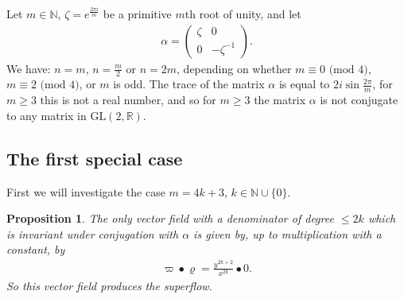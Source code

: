 \documentclass[reqno,12pt]{amsart}
\newtheorem{prop}{Proposition}
\begin{document}
Let $m\in\mathbb{N}$, $\zeta=e^{\frac{2\pi i}{m}}$ be a primitive $m$th root of unity, and let
\begin{eqnarray}
\alpha=\begin{pmatrix}
\zeta & 0\\
0 & -\zeta^{-1}
\end{pmatrix}.\label{alfa}
\end{eqnarray}
We have: $n=m$, $n=\frac{m}{2}$ or $n=2m$, depending on whether $m\equiv0\text{ (mod 4})$, $m\equiv2\text{ (mod 4})$, or $m$ is odd. The trace of the matrix $\alpha$ is equal to $2i\sin\frac{2\pi}{m}$, for $m\geq 3$ this is not a real number, and so for $m\geq 3$ the matrix $\alpha$ is not conjugate to any matrix in $\mathrm{GL}(2,\mathbb{R})$.
  
\subsection{The first special case}
\label{spec-first}
First we will investigate the case $m=4k+3$, $k\in\mathbb{N}\cup\{0\}$.
\begin{prop}The only vector field with a denominator of degree $\leq 2k$ which is  invariant under conjugation with $\alpha$ is given by, up to multiplication with a constant, by
\begin{eqnarray*}
\varpi{\bullet}\varrho=\frac{y^{2k+2}}{x^{2k}}{\bullet} 0.
\end{eqnarray*}
So this vector field produces the superflow. 
\end{prop}
\end{document}
